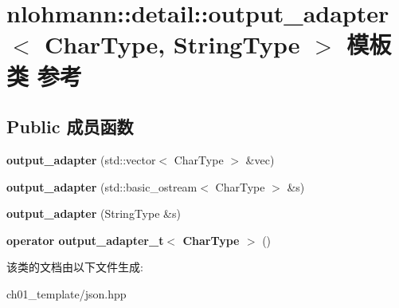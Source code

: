 \hypertarget{classnlohmann_1_1detail_1_1output__adapter}{}\section{nlohmann\+::detail\+::output\+\_\+adapter$<$ Char\+Type, String\+Type $>$ 模板类 参考}
\label{classnlohmann_1_1detail_1_1output__adapter}
\subsection*{Public 成员函数}
\begin{DoxyCompactItemize}
\item 
\mbox{\label{classnlohmann_1_1detail_1_1output__adapter_a05a30a77b568fd84676078d938cbd484}} 
{\bfseries output\+\_\+adapter} (std\+::vector$<$ Char\+Type $>$ \&vec)
\item 
\mbox{\label{classnlohmann_1_1detail_1_1output__adapter_a43b3ba852e6a2c3f4d312543bb04c00d}} 
{\bfseries output\+\_\+adapter} (std\+::basic\+\_\+ostream$<$ Char\+Type $>$ \&s)
\item 
\mbox{\label{classnlohmann_1_1detail_1_1output__adapter_a6ad59d1ec534383b430cd7ef8a518539}} 
{\bfseries output\+\_\+adapter} (String\+Type \&s)
\item 
\mbox{\label{classnlohmann_1_1detail_1_1output__adapter_a5fdac7aec8ade2f4bb0b5df30550d90c}} 
{\bfseries operator output\+\_\+adapter\+\_\+t$<$ Char\+Type $>$} ()
\end{DoxyCompactItemize}


该类的文档由以下文件生成\+:\begin{DoxyCompactItemize}
\item 
ch01\+\_\+template/json.\+hpp\end{DoxyCompactItemize}
